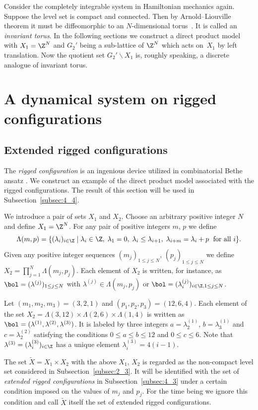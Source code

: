 Consider the completely integrable system in Hamiltonian mechanics again.
Suppose the level set is compact and connected.
Then by Arnold--Liouville theorem it must be dif\/feomorphic to an $N$-dimensional torus~\cite{A}.
It is called an \textit{invariant torus}.
In the following sections we construct a direct product model
with $X_1 = \Z^N$ and $G_2'$ being a sub-lattice of $\Z^N$
which acts on~$X_1$ by left translation.
Now the quotient set $G_2' \backslash X_1$ is, roughly speaking, a discrete
analogue of invariant torus.

\section{A dynamical system on rigged conf\/igurations}\label{sec:3}
\subsection{Extended rigged conf\/igurations}\label{subsec:3_1}

The \textit{rigged configuration}
is an ingenious device utilized in combinatorial Bethe ansatz \cite{KKR,KR}.
We construct an example of the direct product model
associated with the rigged conf\/igurations.
The result of this section will be used in Subsection~\ref{subsec:4_4}.

We introduce a pair of sets $X_1$ and $X_2$.
Choose an arbitrary positive integer $N$ and def\/ine $X_1 = \Z^N$.
For any pair of positive integers $m$, $p$ we def\/ine
\begin{equation}\label{eq:may1_1}
\Lambda (m,p) = \{(\lambda_i)_{i \in \Z} \mid
\lambda_i \in \Z, \; \lambda_1 = 0, \; \lambda_i \le \lambda_{i+1}, \; \lambda_{i+m} = \lambda_i + p\;
\hbox{ for all } i \}.
\end{equation}
Given any positive integer sequences $(m_j)_{1 \leq j \leq N}$, $(p_j)_{1 \leq j \leq N}$
we def\/ine $X_2 = \prod_{j=1}^N \Lambda (m_j,p_j)$.
Each element of $X_2$ is written, for instance, as
$\bol = (\lambda^{(j)})_{1 \leq j \leq N}$ with $\lambda^{(j)} \in \Lambda (m_j,p_j)$
or $\bol = (\lambda^{(j)}_i)_{i \in \Z, 1 \leq j \leq N}$.

\begin{example}\label{ex:oct13_1}
Let $(m_1, m_2, m_3) = (3,2,1)$ and $(p_1, p_2, p_3) = (12,6,4)$.
Each element of the set $X_2 = \Lambda (3,12) \times \Lambda (2,6) \times \Lambda (1,4)$
is written as $\bol = (\lambda^{(1)}, \lambda^{(2)},\lambda^{(3)})$.
It is labeled by {three} integers $a=\lambda^{(1)}_2$, $b=\lambda^{(1)}_3$
and $c=\lambda^{(2)}_2$ satisfying the conditions $0 \leq a \leq b \leq 12$ and $0 \leq c \leq 6$.
Note that $\lambda^{(3)} = (\lambda^{(3)}_i)_{i \in \Z}$ has {a unique} element $\lambda^{(3)}_i = 4 (i-1)$.
\end{example}
The set $\tilde{X} = X_1 \times X_2$ with the above $X_1$, $X_2$ is regarded as the non-compact level set
considered in Subsection~\ref{subsec:2_3}.
It will be identif\/ied with the set of {\em extended rigged configurations} in Subsection~\ref{subsec:4_3}
under a certain condition imposed on the values of $m_j$ and $p_j$.
For the time being we ignore this condition and call $\tilde{X}$ itself the set of extended rigged conf\/igurations.

